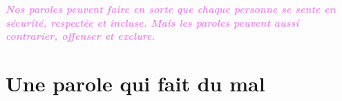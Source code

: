 \documentclass[12pt,openany]{book}
\renewenvironment{quote}{%
  \list{}{%
    \leftmargin-0.1cm   %
    \rightmargin\leftmargin
  }
  \item\relax
}
{\endlist}
\begin{document}
\bigskip
\bigskip

\begin{figure}[h]
    \centering
\end{figure}

\newpage
\thispagestyle{empty}
\begin{figure}[h]
    \centering
\end{figure}

\begin{quote}
\centering
\doublespacing
\textit{\Large \textcolor{violet}{\textbf{Nos paroles peuvent faire en sorte que chaque personne se sente en sécurité, respectée et incluse. Mais les paroles peuvent aussi contrarier, offenser et exclure.}}}
\end{quote}

\chapter*{Une parole qui fait du mal}
\end{document}
